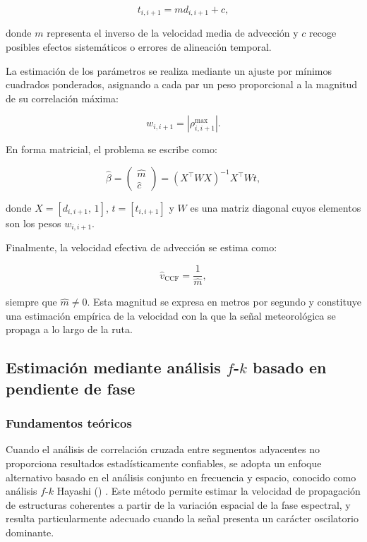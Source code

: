 \documentclass[
  spanish,
  us-letterpaper,
]{scrreprt}
\numberwithin{equation}{section}
\begin{document}
\[
t_{i,i+1} = m d_{i,i+1} + c,
\]

donde \(m\) representa el inverso de la velocidad media de advección y
\(c\) recoge posibles efectos sistemáticos o errores de alineación
temporal.

La estimación de los parámetros se realiza mediante un ajuste por
mínimos cuadrados ponderados, asignando a cada par un peso proporcional
a la magnitud de su correlación máxima:

\[
w_{i,i+1} = |\rho^{\max}_{i,i+1}|.
\]

En forma matricial, el problema se escribe como:

\[
\hat{\beta} = 
\begin{pmatrix}
\hat{m} \\
\hat{c}
\end{pmatrix}
= (X^\top W X)^{-1} X^\top W t,
\]

donde \(X = [d_{i,i+1},\, 1]\), \(t = [t_{i,i+1}]\) y \(W\) es una
matriz diagonal cuyos elementos son los pesos \(w_{i,i+1}\).

Finalmente, la velocidad efectiva de advección se estima como:

\[
\hat{v}_{\text{CCF}} = \frac{1}{\hat{m}},
\]

siempre que \(\hat{m} \neq 0\). Esta magnitud se expresa en metros por
segundo y constituye una estimación empírica de la velocidad con la que
la señal meteorológica se propaga a lo largo de la ruta.

\subsection{\texorpdfstring{Estimación mediante análisis \(f\)-\(k\)
basado en pendiente de
fase}{Estimación mediante análisis f-k basado en pendiente de fase}}\label{estimaciuxf3n-mediante-anuxe1lisis-f-k-basado-en-pendiente-de-fase}

\subsubsection{Fundamentos teóricos}\label{fundamentos-teuxf3ricos}

Cuando el análisis de correlación cruzada entre segmentos adyacentes no
proporciona resultados estadísticamente confiables, se adopta un enfoque
alternativo basado en el análisis conjunto en frecuencia y espacio,
conocido como análisis \(f\)-\(k\) Hayashi
() . Este método permite estimar
la velocidad de propagación de estructuras coherentes a partir de la
variación espacial de la fase espectral, y resulta particularmente
adecuado cuando la señal presenta un carácter oscilatorio dominante.
\end{document}
